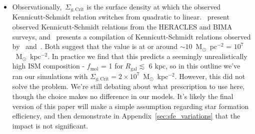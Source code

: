 \documentclass[a4paper, fleqn, usenatbib, useAMS]{mnras}
\begin{document}
\begin{itemize}
	\item Observationally,~$\Sigma_{g,\text{Crit}}$ is the surface density at 
	which the observed Kennicutt-Schmidt relation switches from quadratic to 
	linear.~\citet{Bigiel2008} present observed Kennicutt-Schmidt relations 
	from the HERACLES and BIMA surveys, and~\citet{Krumholz2018} presents a 
	compilation of Kennicutt-Schmidt relations observed by~\citet{Bigiel2010} 
	and~\citet{Leroy2013}. Both suggest that the value is at or around 
	$\sim10$~M$_\odot$~pc$^{-2}$ = $10^7$~M$_\odot$~kpc$^{-2}$. 
	{\color{red} In practice we find that this predicts a seemingly 
	unrealistically high ISM composition - $f_\text{mol}$ = 1 for 
	$R_\text{gal}\lesssim$ 6 kpc, so in this outline we've ran our simulations 
	with $\Sigma_{g,\text{Crit}} = 2\times10^7$~M$_\odot$~kpc$^{-2}$. 
	However, this did not solve the problem. We're still debating about what 
	prescription to use here, though the choice makes no difference in our 
	models. It's likely the final version of this paper will make a simple 
	assumption regarding star formation efficiency, and then demonstrate in 
	Appendix~\ref{sec:sfe_variations} that the impact is not significant. }



\end{itemize}
\end{document}
